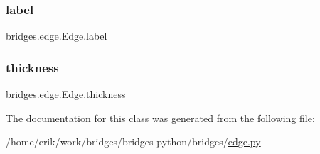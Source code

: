 \subsubsection{\texorpdfstring{label}{label}}
{\footnotesize\ttfamily bridges.\+edge.\+Edge.\+label}

\mbox{\label{classbridges_1_1edge_1_1_edge_ac1fead90d70b6fce8392b4477388f22d}} 
\subsubsection{\texorpdfstring{thickness}{thickness}}
{\footnotesize\ttfamily bridges.\+edge.\+Edge.\+thickness}



The documentation for this class was generated from the following file\+:\begin{DoxyCompactItemize}
\item 
/home/erik/work/bridges/bridges-\/python/bridges/\hyperlink{edge_8py}{edge.\+py}\end{DoxyCompactItemize}
